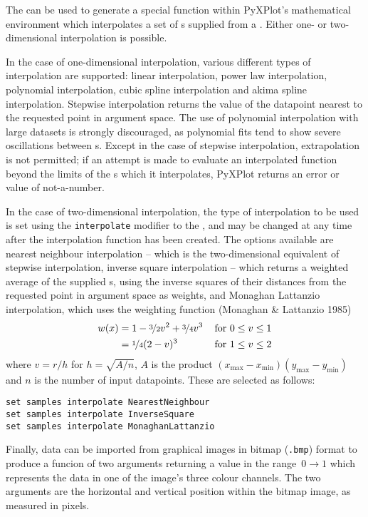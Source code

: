 The  can be used to generate a special function within
PyXPlot's mathematical environment which interpolates a set of \datapoint s
supplied from a \datafile. Either one- or two-dimensional interpolation is
possible.

In the case of one-dimensional interpolation, various different types of
interpolation are supported: linear interpolation, power law interpolation,
polynomial interpolation, cubic spline interpolation and akima spline
interpolation. Stepwise interpolation returns the value of the datapoint
nearest to the requested point in argument space. The use of polynomial
interpolation with large datasets is strongly discouraged, as polynomial fits
tend to show severe oscillations between \datapoint s.  Except in the case of
stepwise interpolation, extrapolation is not permitted; if an attempt is made
to evaluate an interpolated function beyond the limits of the \datapoint s
which it interpolates, PyXPlot returns an error or value of not-a-number.

In the case of two-dimensional interpolation, the type of interpolation to be
used is set using the {\tt interpolate} modifier to the ,
and may be changed at any time after the interpolation function has been
created.  The options available are nearest neighbour interpolation -- which is
the two-dimensional equivalent of stepwise interpolation, inverse square
interpolation -- which returns a weighted average of the supplied \datapoint s,
using the inverse squares of their distances from the requested point in
argument space as weights, and Monaghan Lattanzio interpolation, which uses the
weighting function (Monaghan \& Lattanzio 1985)
\begin{eqnarray*}
w(x) & = 1 - \nicefrac{3}{2}v^2 + \nicefrac{3}{4}v^3 & \,\mathrm{for~}0\leq v\leq 1 \\
     & = \nicefrac{1}{4}(2-v)^3                      & \,\mathrm{for~}1\leq v\leq 2
\end{eqnarray*}
where $v=r/h$ for $h=\sqrt{A/n}$, $A$ is the product
$(x_\mathrm{max}-x_\mathrm{min})(y_\mathrm{max}-y_\mathrm{min})$ and $n$ is the
number of input datapoints. These are selected as follows:

\begin{verbatim}
set samples interpolate NearestNeighbour
set samples interpolate InverseSquare
set samples interpolate MonaghanLattanzio
\end{verbatim}

Finally, data can be imported from graphical images in bitmap ({\tt .bmp}) 
format to produce a funcion of two arguments returning a value in the
range~$0\to1$ which represents the data in one of the image's three colour
channels. The two arguments are the horizontal and vertical position within the
bitmap image, as measured in pixels.

